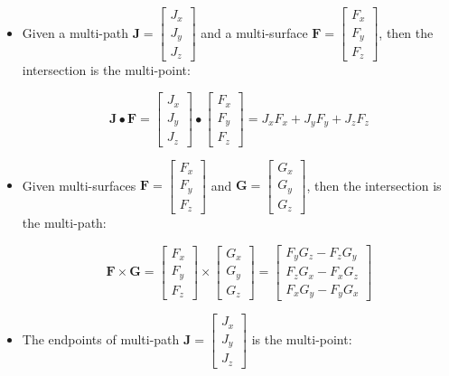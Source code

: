 \begin{itemize}
\item Given a multi-path \(\mathbf{J} = \begin{bmatrix} J_x \\ J_y \\ J_z \end{bmatrix}\) and a multi-surface \(\mathbf{F} = \begin{bmatrix} F_x \\ F_y \\ F_z \end{bmatrix}\), then the intersection is the multi-point:

\[\mathbf{J} \bullet \mathbf{F} = \begin{bmatrix} J_x \\ J_y \\ J_z \end{bmatrix} \bullet \begin{bmatrix} F_x \\ F_y \\ F_z \end{bmatrix} = J_x F_x + J_y F_y + J_z F_z\]
\item Given multi-surfaces \(\mathbf{F} = \begin{bmatrix} F_x \\ F_y \\ F_z \end{bmatrix}\) and \(\mathbf{G} = \begin{bmatrix} G_x \\ G_y \\ G_z \end{bmatrix}\), then the intersection is the multi-path:

\[\mathbf{F} \times \mathbf{G} = \begin{bmatrix} F_x \\ F_y \\ F_z \end{bmatrix} \times \begin{bmatrix} G_x \\ G_y \\ G_z \end{bmatrix}
 = \begin{bmatrix} F_y G_z - F_z G_y \\ F_z G_x - F_x G_z \\ F_x G_y - F_y G_x \end{bmatrix}\]
\item The endpoints of multi-path \(\mathbf{J} = \begin{bmatrix} J_x \\ J_y \\ J_z \end{bmatrix}\) is the multi-point:


\end{itemize}

